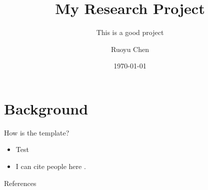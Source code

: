 \documentclass{beamer}
\title{My Research Project}
\subtitle{This is a good project}
\author{Ruoyu Chen}
\institute[USC Price]{Price School of Public Policy\\University of Southern California} %
\date{\today}
\begin{document}
\frame{\titlepage}

\section{Background}

  \begin{frame}{How is the template?}
    \begin{itemize}
      \setlength\itemsep{1em}
      \item Test
      \item I can cite people here \citep{Chen2022}.
    \end{itemize}
  \end{frame}


\begin{frame}[allowframebreaks]{References}
  \small
  
\end{frame}
\end{document}
